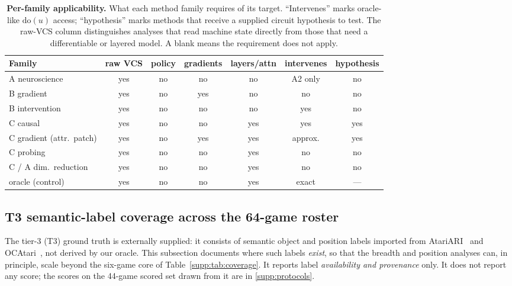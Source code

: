\begin{table}[t]
\centering
\caption{\textbf{Per-family applicability.} What each method family requires of its target.
``Intervenes'' marks oracle-like $\mathrm{do}(u)$ access; ``hypothesis'' marks methods that
receive a supplied circuit hypothesis to test. The raw-VCS column distinguishes analyses that
read machine state directly from those that need a differentiable or layered model. A blank
means the requirement does not apply.}
\label{supp:tab:applic}
\footnotesize
\begin{tabular}{@{}p{3.0cm}cccccc@{}}
\toprule
Family & raw VCS & policy & gradients & layers/attn & intervenes & hypothesis \\
\midrule
A neuroscience & yes & no & no & no & A2 only & no \\
B gradient & yes & no & yes & no & no & no \\
B intervention & yes & no & no & no & yes & no \\
C causal & yes & no & no & yes & yes & yes \\
C gradient (attr.\ patch) & yes & no & yes & yes & approx. & yes \\
C probing & yes & no & no & yes & no & no \\
C / A dim.\ reduction & yes & no & no & yes & no & no \\
oracle (control) & yes & no & no & yes & exact & --- \\
\bottomrule
\end{tabular}
\end{table}

\subsection{T3 semantic-label coverage across the 64-game roster}\label{supp:t3coverage}

The tier-3 (T3) ground truth is externally supplied: it consists of semantic object and position
labels imported from AtariARI~\cite{anand2019unsupervised} and OCAtari~\cite{delfosse2023ocatari},
not derived by our oracle. This subsection documents where such labels \emph{exist}, so that the
breadth and position analyses can, in principle, scale beyond the six-game core of
Table~\ref{supp:tab:coverage}. It reports label \emph{availability and provenance} only. It does
not report any score; the scores on the 44-game scored set drawn from it are in
\Sectionname\ref{supp:protocols}.

